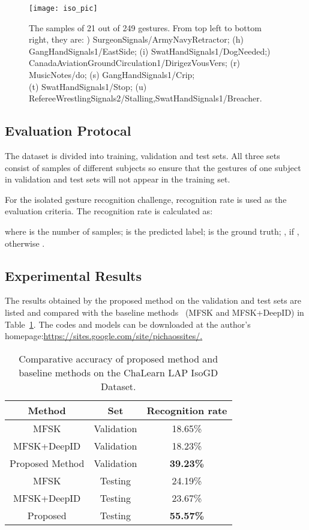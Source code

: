 \documentclass[10pt, a4paper, conference]{IEEEtran}
\begin{document}
\begin{figure*}[t]
\begin{center}
{\texttt{[image: iso\_pic]}}
\end{center}
\caption{The samples of 21 out of 249 gestures. From top left to bottom right, they are: \g) SurgeonSignals/ArmyNavyRetractor; (h) GangHandSignals1/EastSide; (i) SwatHandSignals1/DogNeeded;\q) CanadaAviationGroundCirculation1/DirigezVousVers; (r) MusicNotes/do; (s) GangHandSignals1/Crip;\\ (t) SwatHandSignals1/Stop; (u) RefereeWrestlingSignals2/Stalling,SwatHandSignals1/Breacher.}
\label{fig:samples}
\end{figure*}


\subsection{Evaluation Protocal}

The dataset is divided into training, validation and test sets. All three sets consist of samples of different subjects so ensure that the gestures of one subject in validation and test sets will not appear in the training set. 

For the isolated gesture recognition challenge, recognition rate  is used as the evaluation criteria. The recognition rate is calculated as:

where  is the number of samples;  is the predicted label;  is the ground truth; , if , otherwise . 
 
 
\subsection{Experimental Results}

The results obtained by the proposed method on the validation and test sets are listed and compared with the baseline methods~\cite{pami16Jun} (MFSK and MFSK+DeepID) in Table~\ref{table2}. The codes and models can be downloaded at the author's homepage:\url{https://sites.google.com/site/pichaossites/}\href{https://sites.google.com/site/pichaossites/}.

\begin{table}[!ht]
\centering
\caption{Comparative accuracy of proposed method and baseline 
methods on the ChaLearn LAP IsoGD Dataset. \label{table2}}
\begin{tabular}{|c|c|c|}
\hline
Method & Set & Recognition rate \\
\hline
MFSK & Validation & 18.65\%\\
\hline
MFSK+DeepID & Validation & 18.23\%\\
\hline
Proposed Method & Validation & \textbf{39.23\%}\\
\hline
MFSK & Testing & 24.19\% \\
\hline
MFSK+DeepID & Testing & 23.67\%\\
\hline
Proposed & Testing &\textbf{55.57\%}\\
\hline
\end{tabular}
\end{table}
\end{document}
